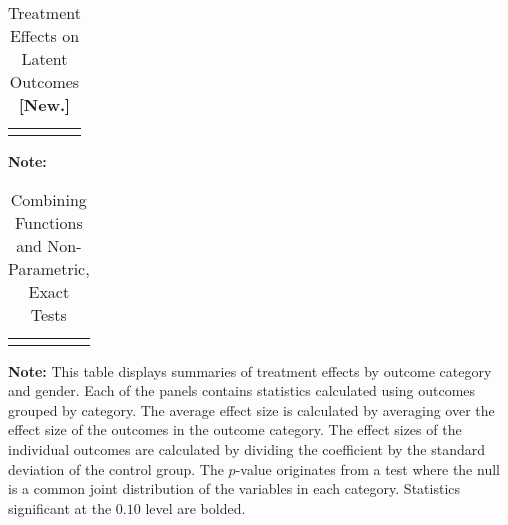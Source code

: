 \begin{sidewaystable}[!htpb]
\begin{threeparttable}
\caption{Treatment Effects on Latent Outcomes \textbf{[New.]}} \label{table:treatfactors2}
\centering 
\begin{tabularx}{22.5cm}{XcX}
&  & 
\end{tabularx}
\begin{tablenotes}
\footnotesize
\item \textbf{Note:} 
\end{tablenotes}
\end{threeparttable}
\end{sidewaystable}

\begin{table}[!htpb]
\begin{threeparttable}
\caption{Combining Functions and Non-Parametric, Exact Tests} \label{table:massiveall}
\centering
\begin{tabularx}{16.75cm}{XcX}
&  & 
\end{tabularx}
\begin{tablenotes}
\footnotesize
\item \textbf{Note:} This table displays summaries of treatment effects by outcome category and gender. Each of the panels contains statistics calculated using outcomes grouped by category. The average effect size is calculated by averaging over the effect size of the outcomes in the outcome category. The effect sizes of the individual outcomes are calculated by dividing the coefficient by the standard deviation of the control group.  The \citet{Rosenbaum_2005_Distribution_JRSS} $p$-value originates from a test where the null is a common joint distribution of the variables in each category. Statistics significant at the $0.10$ level are bolded.
\end{tablenotes}
\end{threeparttable}
\end{table}


